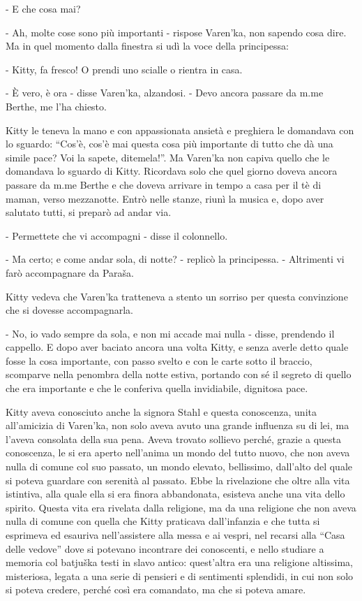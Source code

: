 - E che cosa mai? 

- Ah, molte cose sono più importanti - rispose Varen'ka, non sapendo cosa dire. Ma in quel momento dalla finestra si udì la voce della principessa: 

- Kitty, fa fresco! O prendi uno scialle o rientra in casa. 

- È vero, è ora - disse Varen'ka, alzandosi. - Devo ancora passare da m.me Berthe, me l'ha chiesto. 

Kitty le teneva la mano e con appassionata ansietà e preghiera le domandava con lo sguardo: ``Cos'è, cos'è mai questa cosa più importante di tutto che dà una simile pace? Voi la sapete, ditemela!''. Ma Varen'ka non capiva quello che le domandava lo sguardo di Kitty. Ricordava solo che quel giorno doveva ancora passare da m.me Berthe e che doveva arrivare in tempo a casa per il tè di maman, verso mezzanotte. Entrò nelle stanze, riunì la musica e, dopo aver salutato tutti, si preparò ad andar via. 

- Permettete che vi accompagni - disse il colonnello. 

- Ma certo; e come andar sola, di notte? - replicò la principessa. - Altrimenti vi farò accompagnare da Paraša. 

Kitty vedeva che Varen'ka tratteneva a stento un sorriso per questa convinzione che si dovesse accompagnarla. 

- No, io vado sempre da sola, e non mi accade mai nulla - disse, prendendo il cappello. E dopo aver baciato ancora una volta Kitty, e senza averle detto quale fosse la cosa importante, con passo svelto e con le carte sotto il braccio, scomparve nella penombra della notte estiva, portando con sé il segreto di quello che era importante e che le conferiva quella invidiabile, dignitosa pace. 

\label{xxxiii-1} 

Kitty aveva conosciuto anche la signora Stahl e questa conoscenza, unita all'amicizia di Varen'ka, non solo aveva avuto una grande influenza su di lei, ma l'aveva consolata della sua pena. Aveva trovato sollievo perché, grazie a questa conoscenza, le si era aperto nell'anima un mondo del tutto nuovo, che non aveva nulla di comune col suo passato, un mondo elevato, bellissimo, dall'alto del quale si poteva guardare con serenità al passato. Ebbe la rivelazione che oltre alla vita istintiva, alla quale ella si era finora abbandonata, esisteva anche una vita dello spirito. Questa vita era rivelata dalla religione, ma da una religione che non aveva nulla di comune con quella che Kitty praticava dall'infanzia e che tutta si esprimeva ed esauriva nell'assistere alla messa e ai vespri, nel recarsi alla ``Casa delle vedove'' dove si potevano incontrare dei conoscenti, e nello studiare a memoria col batjuška testi in slavo antico: quest'altra era una religione altissima, misteriosa, legata a una serie di pensieri e di sentimenti splendidi, in cui non solo si poteva credere, perché così era comandato, ma che si poteva amare. 

